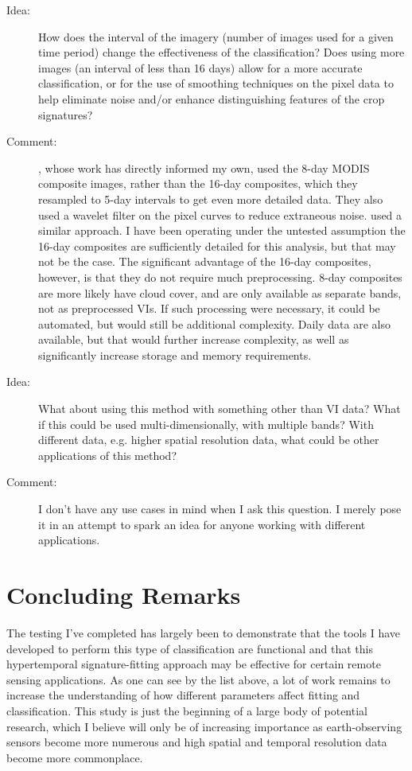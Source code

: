 \begin{description}
\item[Idea:] How does the interval of the imagery (number of images used for a given time period) change the effectiveness of the classification? Does using more images (an interval of less than 16 days) allow for a more accurate classification, or for the use of smoothing techniques on the pixel data to help eliminate noise and/or enhance distinguishing features of the crop signatures?

\item[Comment:] \textcite{sakamoto2010a-two-step}, whose work has directly informed my own, used the 8-day MODIS composite images, rather than the 16-day composites, which they resampled to 5-day intervals to get even more detailed data. They also used a wavelet filter on the pixel curves to reduce extraneous noise. \textcite{doraiswamy2006improved} used a similar approach. I have been operating under the untested assumption the 16-day composites are sufficiently detailed for this analysis, but that may not be the case. The significant advantage of the 16-day composites, however, is that they do not require much preprocessing. 8-day composites are more likely have cloud cover, and are only available as separate bands, not as preprocessed VIs. If such processing were necessary, it could be automated, but would still be additional complexity. Daily data are also available, but that would further increase complexity, as well as significantly increase storage and memory requirements.

\item[Idea:] What about using this method with something other than VI data? What if this could be used multi-dimensionally, with multiple bands? With different data, e.g. higher spatial resolution data, what could be other applications of this method?

\item[Comment:] I don’t have any use cases in mind when I ask this question. I merely pose it in an attempt to spark an idea for anyone working with different applications.
\end{description}

\section{Concluding Remarks}

The testing I’ve completed has largely been to demonstrate that the tools I have developed to perform this type of classification are functional and that this hypertemporal signature-fitting approach may be effective for certain remote sensing applications. As one can see by the list above, a lot of work remains to increase the understanding of how different parameters affect fitting and classification. This study is just the beginning of a large body of potential research, which I believe will only be of increasing importance as earth-observing sensors become more numerous and high spatial and temporal resolution data become more commonplace.